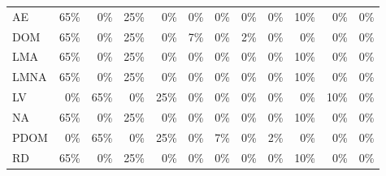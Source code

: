 \begin{figure*}[h]
\begin{tabular}{lrrrrrrrrrrr}
AE    & \cellcolor{lightgreen}65\%  & \cellcolor{lightred}0\%   & \cellcolor{lightgreen}25\%  & \cellcolor{lightred}0\%   & \cellcolor{lightred}0\%   & \cellcolor{lightred}0\%   & \cellcolor{lightred}0\%   & \cellcolor{lightred}0\%   & \cellcolor{lightgreen}10\%  & \cellcolor{lightred}0\%   & \cellcolor{lightred}0\% \\
DOM   & \cellcolor{lightgreen}65\%  & \cellcolor{lightred}0\%   & \cellcolor{lightgreen}25\%  & \cellcolor{lightred}0\%   & \cellcolor{lightblack}7\%   & \cellcolor{lightred}0\%   & \cellcolor{lightblack}2\%   & \cellcolor{lightred}0\%   & \cellcolor{lightred}0\%   & \cellcolor{lightred}0\%   & \cellcolor{lightred}0\% \\
LMA   & \cellcolor{lightgreen}65\%  & \cellcolor{lightred}0\%   & \cellcolor{lightgreen}25\%  & \cellcolor{lightred}0\%   & \cellcolor{lightred}0\%   & \cellcolor{lightred}0\%   & \cellcolor{lightred}0\%   & \cellcolor{lightred}0\%   & \cellcolor{lightgreen}10\%  & \cellcolor{lightred}0\%   & \cellcolor{lightred}0\% \\
LMNA  & \cellcolor{lightgreen}65\%  & \cellcolor{lightred}0\%   & \cellcolor{lightgreen}25\%  & \cellcolor{lightred}0\%   & \cellcolor{lightred}0\%   & \cellcolor{lightred}0\%   & \cellcolor{lightred}0\%   & \cellcolor{lightred}0\%   & \cellcolor{lightgreen}10\%  & \cellcolor{lightred}0\%   & \cellcolor{lightred}0\% \\
LV   & \cellcolor{lightred}0\%   & \cellcolor{lightgreen}65\%  & \cellcolor{lightred}0\%   & \cellcolor{lightgreen}25\%  & \cellcolor{lightred}0\%   & \cellcolor{lightred}0\%   & \cellcolor{lightred}0\%   & \cellcolor{lightred}0\%   & \cellcolor{lightred}0\%   & \cellcolor{lightgreen}10\%  & \cellcolor{lightred}0\% \\
NA    & \cellcolor{lightgreen}65\%  & \cellcolor{lightred}0\%   & \cellcolor{lightgreen}25\%  & \cellcolor{lightred}0\%   & \cellcolor{lightred}0\%   & \cellcolor{lightred}0\%   & \cellcolor{lightred}0\%   & \cellcolor{lightred}0\%   & \cellcolor{lightgreen}10\%  & \cellcolor{lightred}0\%   & \cellcolor{lightred}0\% \\
PDOM  & \cellcolor{lightred}0\%   & \cellcolor{lightgreen}65\%  & \cellcolor{lightred}0\%   & \cellcolor{lightgreen}25\%  & \cellcolor{lightred}0\%   & \cellcolor{lightblack}7\%   & \cellcolor{lightred}0\%   & \cellcolor{lightblack}2\%   & \cellcolor{lightred}0\%   & \cellcolor{lightred}0\%   & \cellcolor{lightred}0\% \\
RD    & \cellcolor{lightgreen}65\%  & \cellcolor{lightred}0\%   & \cellcolor{lightgreen}25\%  & \cellcolor{lightred}0\%   & \cellcolor{lightred}0\%   & \cellcolor{lightred}0\%   & \cellcolor{lightred}0\%   & \cellcolor{lightred}0\%   & \cellcolor{lightgreen}10\%  & \cellcolor{lightred}0\%   & \cellcolor{lightred}0\% \\

\end{tabular}
\end{figure*}
